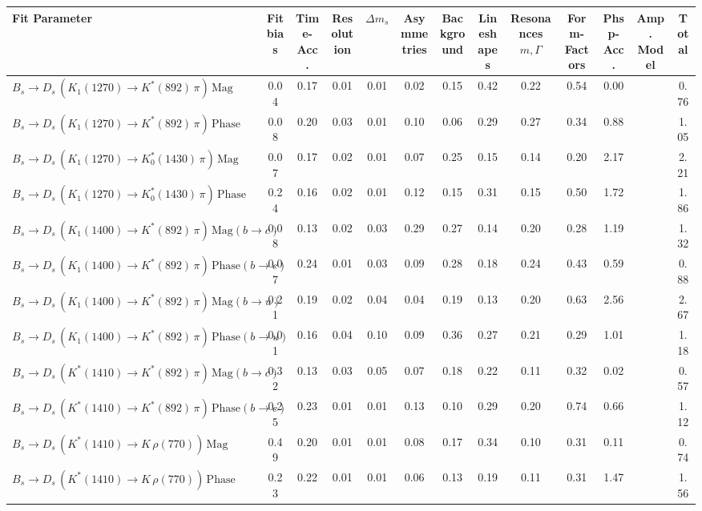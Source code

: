 \begin{tabular}{l  c  c  c  c  c  c  c  c  c  c  c  | c }
\hline
\hline
Fit Parameter & Fit bias & Time-Acc. & Resolution & $\Delta m_{s}$ & Asymmetries & Background & Lineshapes & Resonances $m,\Gamma$ & Form-Factors & Phsp-Acc. & Amp. Model &  Total  \\ 
\hline
$B_s \to D_s \, ( K_1(1270) \to K^{*}(892) \, \pi ) \, \text{Mag}$ & 0.04 & 0.17 & 0.01 & 0.01 & 0.02 & 0.15 & 0.42 & 0.22 & 0.54 & 0.00 &  & 0.76 \\ 
$B_s \to D_s \, ( K_1(1270) \to K^{*}(892) \, \pi ) \, \text{Phase}$ & 0.08 & 0.20 & 0.03 & 0.01 & 0.10 & 0.06 & 0.29 & 0.27 & 0.34 & 0.88 &  & 1.05 \\ 
$B_s \to D_s \, ( K_1(1270) \to K^{*}_{0}(1430) \, \pi ) \, \text{Mag} $ & 0.07 & 0.17 & 0.02 & 0.01 & 0.07 & 0.25 & 0.15 & 0.14 & 0.20 & 2.17 &  & 2.21 \\ 
$B_s \to D_s \, ( K_1(1270) \to K^{*}_{0}(1430) \, \pi ) \, \text{Phase} $ & 0.24 & 0.16 & 0.02 & 0.01 & 0.12 & 0.15 & 0.31 & 0.15 & 0.50 & 1.72 &  & 1.86 \\ 
$B_s \to D_s \, ( K_1(1400) \to K^{*}(892) \, \pi ) \, \text{Mag} (b \to c)$ & 0.08 & 0.13 & 0.02 & 0.03 & 0.29 & 0.27 & 0.14 & 0.20 & 0.28 & 1.19 &  & 1.32 \\ 
$B_s \to D_s \, ( K_1(1400) \to K^{*}(892) \, \pi ) \, \text{Phase} (b \to c)$ & 0.07 & 0.24 & 0.01 & 0.03 & 0.09 & 0.28 & 0.18 & 0.24 & 0.43 & 0.59 &  & 0.88 \\ 
$B_s \to D_s \, ( K_1(1400) \to K^{*}(892) \, \pi ) \, \text{Mag} (b \to u)$ & 0.21 & 0.19 & 0.02 & 0.04 & 0.04 & 0.19 & 0.13 & 0.20 & 0.63 & 2.56 &  & 2.67 \\ 
$B_s \to D_s \, ( K_1(1400) \to K^{*}(892) \, \pi ) \, \text{Phase} (b \to u)$ & 0.01 & 0.16 & 0.04 & 0.10 & 0.09 & 0.36 & 0.27 & 0.21 & 0.29 & 1.01 &  & 1.18 \\ 
$B_s \to D_s \, ( K^{*}(1410) \to K^{*}(892) \, \pi ) \, \text{Mag} (b \to c)$ & 0.32 & 0.13 & 0.03 & 0.05 & 0.07 & 0.18 & 0.22 & 0.11 & 0.32 & 0.02 &  & 0.57 \\ 
$B_s \to D_s \, ( K^{*}(1410) \to K^{*}(892) \, \pi ) \, \text{Phase} (b \to c)$ & 0.25 & 0.23 & 0.01 & 0.01 & 0.13 & 0.10 & 0.29 & 0.20 & 0.74 & 0.66 &  & 1.12 \\ 
$B_s \to D_s \, ( K^{*}(1410) \to K \, \rho(770) ) \, \text{Mag}$ & 0.49 & 0.20 & 0.01 & 0.01 & 0.08 & 0.17 & 0.34 & 0.10 & 0.31 & 0.11 &  & 0.74 \\ 
$B_s \to D_s \, ( K^{*}(1410) \to K \, \rho(770) ) \, \text{Phase}$ & 0.23 & 0.22 & 0.01 & 0.01 & 0.06 & 0.13 & 0.19 & 0.11 & 0.31 & 1.47 &  & 1.56 \\ 

\end{tabular}
